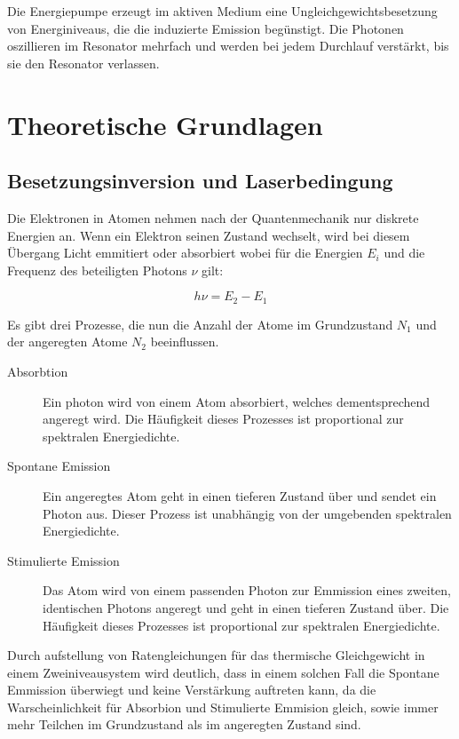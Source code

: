 \documentclass[slug=GL, room=HZDR\ Dresden/Rossendorf\,\ Geb.\ 620/123, supervisor=Tim\ Ziegler]{../../Lab_Report_LaTeX/lab_report}
\begin{document}
Die Energiepumpe erzeugt im aktiven Medium eine
Ungleichgewichtsbesetzung von Energiniveaus, die die induzierte
Emission beg\"unstigt. Die Photonen oszillieren im Resonator mehrfach
und werden bei jedem Durchlauf verst\"arkt, bis sie den
Resonator verlassen.

\section{Theoretische Grundlagen}%
\label{sec:theo}

\subsection{Besetzungsinversion und Laserbedingung}%
\label{sec:inv}

Die Elektronen in Atomen nehmen nach der Quantenmechanik nur diskrete
Energien an. Wenn ein Elektron seinen Zustand wechselt, wird bei
diesem \"Ubergang Licht emmitiert oder absorbiert wobei f\"ur die
Energien \(E_i\) und die Frequenz des beteiligten Photons \(\nu\) gilt:

\begin{equation}
  \label{eq:transfreq}
  h\nu = E_2 - E_1
\end{equation}

Es gibt drei Prozesse, die nun die Anzahl der Atome im Grundzustand
\(N_1\) und der angeregten Atome \(N_2\) beeinflussen.

\begin{description}
\item[Absorbtion] Ein photon wird von einem Atom absorbiert, welches
  dementsprechend angeregt wird. Die H\"aufigkeit dieses Prozesses ist
  proportional zur spektralen Energiedichte.
\item[Spontane Emission] Ein angeregtes Atom geht in einen tieferen
  Zustand \"uber und sendet ein Photon aus. Dieser Prozess ist
  unabh\"angig von der umgebenden spektralen Energiedichte.
\item[Stimulierte Emission] Das Atom wird von einem passenden Photon
  zur Emmission eines zweiten, identischen Photons angeregt und geht
  in einen tieferen Zustand \"uber. Die H\"aufigkeit dieses Prozesses ist
  proportional zur spektralen Energiedichte.
\end{description}

Durch aufstellung von Ratengleichungen f\"ur das thermische
Gleichgewicht in einem Zweiniveausystem wird deutlich, dass in einem
solchen Fall die Spontane Emmission \"uberwiegt und keine
Verst\"arkung auftreten kann, da die Warscheinlichkeit f\"ur Absorbion
und Stimulierte Emmision gleich, sowie immer mehr Teilchen im
Grundzustand als im angeregten Zustand sind.
\end{document}
